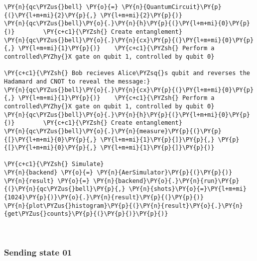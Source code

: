    \begin{tcolorbox}[breakable, size=fbox, boxrule=1pt, pad at break*=1mm,colback=cellbackground, colframe=cellborder]
\begin{Verbatim}[commandchars=\\\{\}]
\PY{n}{qc\PYZus{}bell} \PY{o}{=} \PY{n}{QuantumCircuit}\PY{p}{(}\PY{l+m+mi}{2}\PY{p}{,} \PY{l+m+mi}{2}\PY{p}{)}
\PY{n}{qc\PYZus{}bell}\PY{o}{.}\PY{n}{h}\PY{p}{(}\PY{l+m+mi}{0}\PY{p}{)}        \PY{c+c1}{\PYZsh{} Create entanglement}
\PY{n}{qc\PYZus{}bell}\PY{o}{.}\PY{n}{cx}\PY{p}{(}\PY{l+m+mi}{0}\PY{p}{,} \PY{l+m+mi}{1}\PY{p}{)}    \PY{c+c1}{\PYZsh{} Perform a controlled\PYZhy{}X gate on qubit 1, controlled by qubit 0}

\PY{c+c1}{\PYZsh{} Bob recieves Alice\PYZsq{}s qubit and reverses the Hadamard and CNOT to reveal the message:}
\PY{n}{qc\PYZus{}bell}\PY{o}{.}\PY{n}{cx}\PY{p}{(}\PY{l+m+mi}{0}\PY{p}{,} \PY{l+m+mi}{1}\PY{p}{)}    \PY{c+c1}{\PYZsh{} Perform a controlled\PYZhy{}X gate on qubit 1, controlled by qubit 0}
\PY{n}{qc\PYZus{}bell}\PY{o}{.}\PY{n}{h}\PY{p}{(}\PY{l+m+mi}{0}\PY{p}{)}        \PY{c+c1}{\PYZsh{} Create entanglement}
\PY{n}{qc\PYZus{}bell}\PY{o}{.}\PY{n}{measure}\PY{p}{(}\PY{p}{[}\PY{l+m+mi}{0}\PY{p}{,} \PY{l+m+mi}{1}\PY{p}{]}\PY{p}{,} \PY{p}{[}\PY{l+m+mi}{0}\PY{p}{,} \PY{l+m+mi}{1}\PY{p}{]}\PY{p}{)}

\PY{c+c1}{\PYZsh{} Simulate}
\PY{n}{backend} \PY{o}{=} \PY{n}{AerSimulator}\PY{p}{(}\PY{p}{)}
\PY{n}{result} \PY{o}{=} \PY{n}{backend}\PY{o}{.}\PY{n}{run}\PY{p}{(}\PY{n}{qc\PYZus{}bell}\PY{p}{,} \PY{n}{shots}\PY{o}{=}\PY{l+m+mi}{1024}\PY{p}{)}\PY{o}{.}\PY{n}{result}\PY{p}{(}\PY{p}{)}
\PY{n}{plot\PYZus{}histogram}\PY{p}{(}\PY{n}{result}\PY{o}{.}\PY{n}{get\PYZus{}counts}\PY{p}{(}\PY{p}{)}\PY{p}{)}
\end{Verbatim}
\end{tcolorbox}
 
            
    
    \begin{center}
    \end{center}
    { \hspace*{\fill} \\}
    

    \hypertarget{sending-state-01}{%
\subsubsection*{Sending state 01}\label{sending-state-01}}

